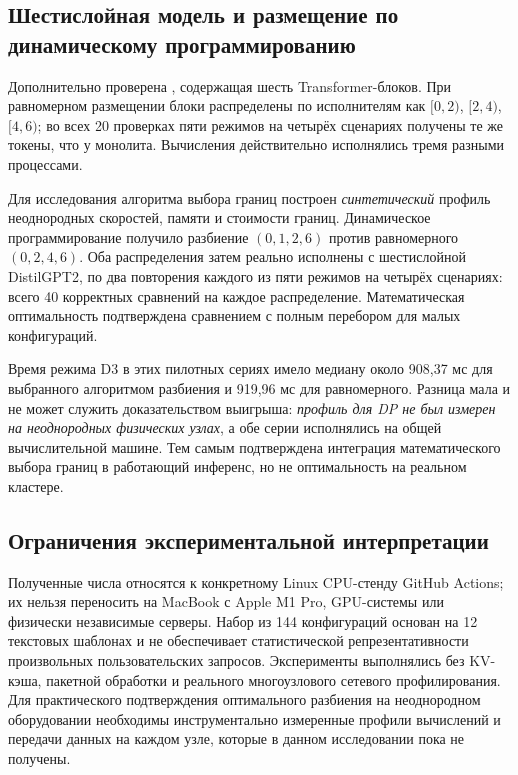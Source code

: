 \subsection{Шестислойная модель и размещение по динамическому программированию}

Дополнительно проверена , содержащая шесть Transformer-блоков. При равномерном размещении блоки распределены по исполнителям как $[0,2)$, $[2,4)$, $[4,6)$; во всех 20 проверках пяти режимов на четырёх сценариях получены те же токены, что у монолита. Вычисления действительно исполнялись тремя разными процессами.

Для исследования алгоритма выбора границ построен \emph{синтетический} профиль неоднородных скоростей, памяти и стоимости границ. Динамическое программирование получило разбиение $(0,1,2,6)$ против равномерного $(0,2,4,6)$. Оба распределения затем реально исполнены с шестислойной DistilGPT2, по два повторения каждого из пяти режимов на четырёх сценариях: всего 40 корректных сравнений на каждое распределение. Математическая оптимальность подтверждена сравнением с полным перебором для малых конфигураций.

Время режима D3 в этих пилотных сериях имело медиану около 908,37 мс для выбранного алгоритмом разбиения и 919,96 мс для равномерного. Разница мала и не может служить доказательством выигрыша: \emph{профиль для DP не был измерен на неоднородных физических узлах}, а обе серии исполнялись на общей вычислительной машине. Тем самым подтверждена интеграция математического выбора границ в работающий инференс, но не оптимальность на реальном кластере.

\subsection{Ограничения экспериментальной интерпретации}

Полученные числа относятся к конкретному Linux CPU-стенду GitHub Actions; их нельзя переносить на MacBook с Apple M1 Pro, GPU-системы или физически независимые серверы. Набор из 144 конфигураций основан на 12 текстовых шаблонах и не обеспечивает статистической репрезентативности произвольных пользовательских запросов. Эксперименты выполнялись без KV-кэша, пакетной обработки и реального многоузлового сетевого профилирования. Для практического подтверждения оптимального разбиения на неоднородном оборудовании необходимы инструментально измеренные профили вычислений и передачи данных на каждом узле, которые в данном исследовании пока не получены.

